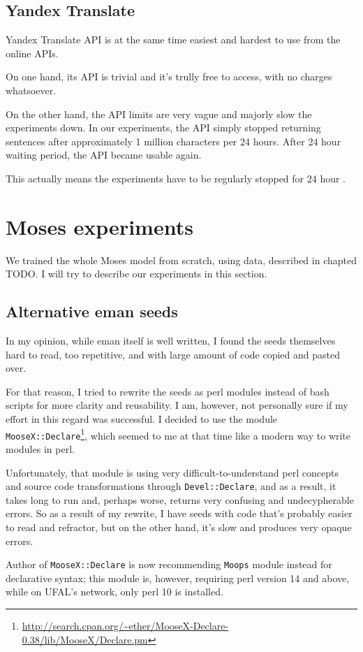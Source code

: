 \subsection{Yandex Translate}
Yandex Translate API is at the same time easiest and hardest to use from the online APIs.

On one hand, its API is trivial and it's trully free to access, with no charges whatsoever.

On the other hand, the API limits are very vague and majorly slow the experiments down. In our experiments, the API simply stopped returning sentences after approximately 1 million characters per 24 hours. After 24 hour waiting period, the API became usable again.

This actually means the experiments have to be regularly stopped for 24 hour .

\section{Moses experiments}
We trained the whole Moses model from scratch, using data, described in chapted TODO. I will try to describe our experiments in this section.
\subsection{Alternative eman seeds}

In my opinion, while eman itself is well written, I found the seeds themselves hard to read, too repetitive, and with large amount of code copied and pasted over. 

For that reason, I tried to rewrite the seeds as perl modules instead of bash scripts for more clarity and reusability. I am, however, not personally sure if my effort in this regard was successful. I decided to use the module \texttt{MooseX::Declare}\footnote{\url{http://search.cpan.org/~ether/MooseX-Declare-0.38/lib/MooseX/Declare.pm}}, which seemed to me at that time like a modern way to write modules in perl. 

Unfortunately, that module is using very difficult-to-understand perl concepts and source code transformations through \texttt{Devel::Declare}, and as a result, it takes long to run and, perhaps worse, returns very confusing and undecypherable errors. 
So as a result of my rewrite, I have seeds with code that's probably easier to read and refractor, but on the other hand, it's slow and produces very opaque errors.

Author of \texttt{MooseX::Declare} is now recommending \texttt{Moops} module instead for declarative syntax; this module is, however, requiring perl version 14 and above, while on UFAL's network, only perl 10 is installed.

